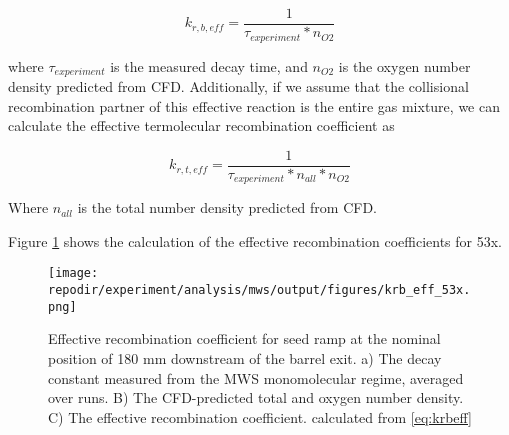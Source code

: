 \begin{equation}
    \label{eq:krbeff}
    k_{r,b,eff} = \frac{1}{\tau_{experiment} *  n_{O2}}
\end{equation}

where $\tau_{experiment}$ is the measured decay time,  and $n_{O2}$ is the oxygen number density predicted from CFD. Additionally, if we assume that the collisional recombination partner of this effective reaction is the entire gas mixture, we can calculate the effective termolecular recombination coefficient as


\begin{equation}
    \label{eq:krteff}
    k_{r,t,eff} = \frac{1}{\tau_{experiment} * n_{all} *  n_{O2}}
\end{equation}

Where $n_{all}$ is the total number density predicted from CFD.

Figure \ref{fig:SI_krb_eff_53x} shows the calculation of the effective recombination coefficients for 53x.

\begin{figure}[]
\centering
\texttt{[image: \\repodir/experiment/analysis/mws/output/figures/krb\_eff\_53x.png]}
\caption{Effective recombination coefficient for seed ramp at the nominal position of 180 mm downstream of the barrel exit. a) The decay constant measured from the MWS monomolecular regime, averaged over runs. B) The CFD-predicted total and oxygen number density. C) The effective recombination coefficient. calculated from \ref{eq:krbeff}}
\label{fig:SI_krb_eff_53x}
\end{figure}